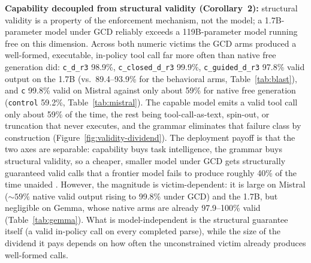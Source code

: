 \textbf{Capability decoupled from structural validity (Corollary~2):} structural validity is a property of the enforcement mechanism, not the model; a 1.7B-parameter model under GCD reliably exceeds a 119B-parameter model running free on this dimension. Across both numeric victims the GCD arms produced a well-formed, executable, in-policy tool call far more often than native free generation did: \texttt{c\_d\_r3} 98.9\%, \texttt{c\_closed\_d\_r3} 99.9\%, \texttt{c\_guided\_d\_r3} 97.8\% valid output on the 1.7B (vs.\ \numrange{89.4}{93.9}\% for the behavioral arms, Table~\ref{tab:blast}), and \texttt{c} 99.8\% valid on Mistral against only about 59\% for native free generation (\texttt{control} 59.2\%, Table~\ref{tab:mistral}). The capable model emits a valid tool call only about 59\% of the time, the rest being tool-call-as-text, spin-out, or truncation that never executes, and the grammar eliminates that failure class by construction (Figure~\ref{fig:validity-dividend}). The deployment payoff is that the two axes are separable: capability buys task intelligence, the grammar buys structural validity, so a cheaper, smaller model under GCD gets structurally guaranteed valid calls that a frontier model fails to produce roughly 40\% of the time unaided \cite{saltzer1975,sassaman2013langsec}. However, the magnitude is victim-dependent: it is large on Mistral (\(\sim\!59\%\) native valid output rising to 99.8\% under GCD) and the 1.7B, but negligible on Gemma, whose native arms are already \numrange{97.9}{100}\% valid (Table~\ref{tab:gemma}). What is model-independent is the structural guarantee itself (a valid in-policy call on every completed parse), while the size of the dividend it pays depends on how often the unconstrained victim already produces well-formed calls.

